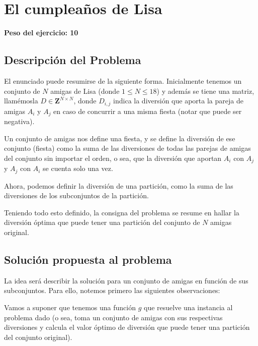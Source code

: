 \newpage{}
\section{El cumpleaños de Lisa}
\textbf{Peso del ejercicio: 10}
\subsection{Descripción del Problema}

El enunciado puede resumirse de la siguiente forma. Inicialmente tenemos un conjunto de $N$ amigas de Lisa (donde $ 1 \leq N \leq 18$) y además se tiene una matriz, llamémosla $D \in \mathbf{Z}^{N \times N}$, donde $D_{i,j}$ indica la diversión que aporta la pareja de amigas $A_i$ y $A_j$ en caso de concurrir a una misma fiesta (notar que puede ser negativa).

Un conjunto de amigas nos define una fiesta, y se define la diversión de ese conjunto (fiesta) como la suma de las diversiones de todas las parejas de amigas del conjunto sin importar el orden, o sea, que la diversión que aportan $A_i$ con $A_j$ y $A_j$ con $A_i$ se cuenta solo una vez.

Ahora, podemos definir la diversión de una partición, como la suma de las diversiones de los subconjuntos de la partición.

Teniendo todo esto definido, la consigna del problema se resume en hallar la diversión óptima que puede tener una partición del conjunto de $N$ amigas original. 

\subsection{Solución propuesta al problema}

La idea será describir la solución para un conjunto de amigas en función de sus subconjuntos. Para ello, notemos primero las siguientes observaciones:

Vamos a suponer que tenemos una función $g$ que resuelve una instancia al problema dado (o sea, toma un conjunto de amigas con sus respectivas diversiones y calcula el valor óptimo de diversión que puede tener una partición del conjunto original).

